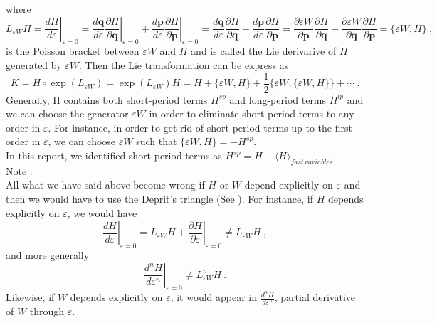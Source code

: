 \documentclass[a4paper]{article}
\begin{document}
where 
\begin{equation}
L_{\varepsilon W} H=\left. \frac{d H}{d \varepsilon} \right|_{\varepsilon=0} = \left. \frac{d \mathbf q}{d \varepsilon}\frac{\partial H}{\partial \mathbf q} \right|_{\varepsilon=0} + \left. \frac{d \mathbf p}{d \varepsilon}\frac{\partial H}{\partial \mathbf p} \right|_{\varepsilon=0}  = \frac{d \mathbf q}{d \varepsilon}\frac{\partial H}{\partial \mathbf q}+\frac{d \mathbf p}{d \varepsilon}\frac{\partial H}{\partial \mathbf p}=\frac{\partial \varepsilon W}{\partial \mathbf p}\frac{\partial H}{\partial \mathbf q}-\frac{\partial \varepsilon W}{\partial \mathbf q}\frac{\partial H}{\partial \mathbf p}=\{\varepsilon W,H\} \ ,
\end{equation}
is the Poisson bracket between $\varepsilon W$ and $H$ and is called the Lie derivarive of $H$ generated by $\varepsilon W$.
Then the Lie transformation can be express as
\begin{equation}
K=H \circ \exp (L_{\varepsilon W})=\exp (L_{\varepsilon W})H=H+\{\varepsilon W,H\}+\frac{1}{2}\{\varepsilon W,\{\varepsilon W,H\}\}+ \cdots \ .
\end{equation}
Generally, H contains both short-period terms $H^{sp}$ and long-period terms $H^{lp}$ and we can choose the generator $\varepsilon W$ in order to eliminate short-period terms to any order in $\varepsilon$. For instance, in order to get rid of short-period terms up to the first order in $\varepsilon$, we can choose $\varepsilon W$ such that $\{\varepsilon W,H\}=-H^{sp}$. \\
In this report, we identified short-period terms as $H^{sp}=H-\langle H \rangle_{fast \, variables}$. \\
Note :  \\
All what we have said above become wrong if $H$ or $W$ depend explicitly on $\varepsilon$ and then we would have to use the Deprit's triangle (See \cite{Boccaletti2}).
For instance, if $H$ depends explicitly on $\varepsilon$, we would have
\begin{equation}
\left. \frac{d H}{d \varepsilon} \right|_{\varepsilon=0}
=L_{\varepsilon W} H + \left. \frac{\partial H}{\partial \varepsilon} \right|_{\varepsilon=0}
\neq L_{\varepsilon W} H \ ,
\end{equation}
and more generally
\begin{equation}
\left. \frac{ d^{n}H}{d \varepsilon^{n}} \right|_{\varepsilon=0} \neq L^{n}_{\varepsilon W}H \ .
\end{equation}
Likewise, if $W$ depends explicitly on $\varepsilon$, it would appear in $\frac{ d^{n}H}{d \varepsilon^{n}}$, partial derivative of $W$ through $\varepsilon$.
\end{document}
